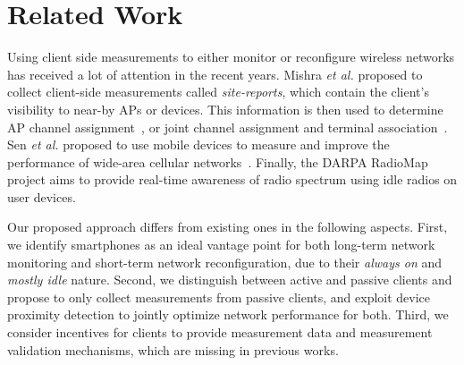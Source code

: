 \section{Related Work}
\label{sec:related}

Using client side measurements to either monitor or reconfigure
wireless networks has received a lot of attention in the recent
years. Mishra \textit{et al.}  proposed to collect client-side
measurements called \textit{site-reports}, which contain the client's
visibility to near-by APs or devices. This information is then used to determine AP channel
assignment~\cite{mishra:mccr2005,dasilva:mswim2008,mishra:mobicom2006},
or joint channel assignment and terminal
association~\cite{mishra:infocom2006}. Sen \textit{et al.} proposed to
use mobile devices to measure and improve the performance of wide-area
cellular networks~\cite{sen2011can}. Finally, the DARPA
RadioMap~\cite{radiomap} project aims to provide real-time awareness of
radio spectrum using idle radios on user devices.

Our proposed approach differs from existing ones in the following
aspects. First, we identify smartphones as an ideal vantage point for
both long-term network monitoring and short-term network
reconfiguration, due to their \textit{always on } and \textit{mostly
  idle} nature. Second, we distinguish between active and passive
clients and propose to only collect measurements from passive clients,
and exploit device proximity detection to jointly optimize network
performance for both. Third, we consider incentives for clients to
provide measurement data and measurement validation mechanisms, which
are missing in previous works.
